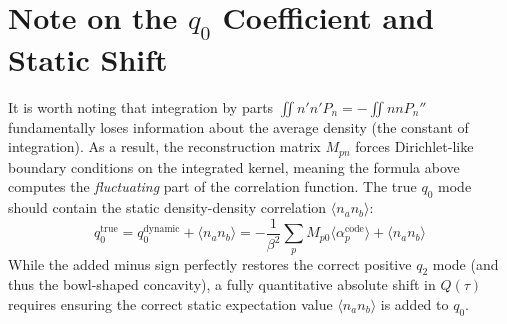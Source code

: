 \documentclass{article}
\begin{document}
\section{Note on the $q_0$ Coefficient and Static Shift}
It is worth noting that integration by parts $\iint n' n' P_n = - \iint n n P_n''$ fundamentally loses information about the average density (the constant of integration). 
As a result, the reconstruction matrix $M_{pn}$ forces Dirichlet-like boundary conditions on the integrated kernel, meaning the formula above computes the \textit{fluctuating} part of the correlation function.
The true $q_0$ mode should contain the static density-density correlation $\langle n_a n_b \rangle$:
\begin{equation}
q_0^{\text{true}} = q_0^{\text{dynamic}} + \langle n_a n_b \rangle = - \frac{1}{\beta^2} \sum_p M_{p0} \langle \alpha_p^{\text{code}} \rangle + \langle n_a n_b \rangle
\end{equation}
While the added minus sign perfectly restores the correct positive $q_2$ mode (and thus the bowl-shaped concavity), a fully quantitative absolute shift in $Q(\tau)$ requires ensuring the correct static expectation value $\langle n_a n_b \rangle$ is added to $q_0$.
\end{document}
